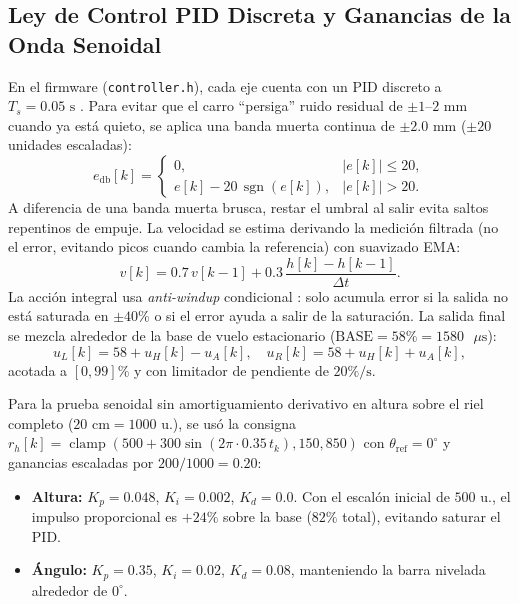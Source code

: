 \documentclass[conference]{IEEEtran}
\begin{document}
\subsection{Ley de Control PID Discreta y Ganancias de la Onda Senoidal}
En el firmware (\texttt{controller.h}), cada eje cuenta con un PID discreto a $T_s = 0.05\text{ s}$ \cite{cayetano_pid}. Para evitar que el carro ``persiga'' ruido residual de $\pm 1\text{--}2\text{ mm}$ cuando ya est\'{a} quieto, se aplica una banda muerta continua de $\pm 2.0\text{ mm}$ ($\pm 20$ unidades escaladas):
\begin{equation}
  e_{\text{db}}[k] =
  \begin{cases}
    0, & |e[k]| \le 20, \\
    e[k] - 20\,\operatorname{sgn}(e[k]), & |e[k]| > 20.
  \end{cases}
  \label{eq:deadband}
\end{equation}
A diferencia de una banda muerta brusca, restar el umbral al salir evita saltos repentinos de empuje. La velocidad se estima derivando la medici\'{o}n filtrada (no el error, evitando picos cuando cambia la referencia) con suavizado EMA:
\begin{equation}
  v[k] = 0.7\,v[k-1] + 0.3\,\frac{h[k] - h[k-1]}{\Delta t}.
\end{equation}
La acci\'{o}n integral usa \textit{anti-windup} condicional \cite{cayetano_pid}: solo acumula error si la salida no est\'{a} saturada en $\pm 40\%$ o si el error ayuda a salir de la saturaci\'{o}n. La salida final se mezcla alrededor de la base de vuelo estacionario ($\text{BASE} = 58\% = 1580\text{ }\mu\text{s}$):
\begin{equation}
  u_L[k] = 58 + u_H[k] - u_A[k], \quad u_R[k] = 58 + u_H[k] + u_A[k],
\end{equation}
acotada a $[0, 99]\%$ y con limitador de pendiente de $20\%/\text{s}$.

Para la prueba senoidal sin amortiguamiento derivativo en altura sobre el riel completo ($20\text{ cm} = 1000$ u.), se us\'{o} la consigna $r_h[k] = \operatorname{clamp}(500 + 300\sin(2\pi \cdot 0.35\,t_k), 150, 850)$ con $\theta_{\text{ref}} = 0^\circ$ y ganancias escaladas por $200/1000 = 0.20$:
\begin{itemize}
  \item \textbf{Altura:} $K_p = 0.048$, $K_i = 0.002$, $K_d = 0.0$. Con el escal\'{o}n inicial de $500$ u., el impulso proporcional es $+24\%$ sobre la base ($82\%$ total), evitando saturar el PID.
  \item \textbf{\'{A}ngulo:} $K_p = 0.35$, $K_i = 0.02$, $K_d = 0.08$, manteniendo la barra nivelada alrededor de $0^\circ$.
\end{itemize}
\end{document}
